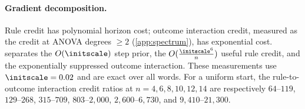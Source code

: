 \begin{table}[H]
\centering\small
{}
\caption{\textbf{Outcome escape grows exponentially while step escape stays nearly constant.} $\initscale=0.002$, zero readout;
ranges are over three draws.}
\label{tab:exit-times}
\end{table}
\paragraph{Gradient decomposition.} Rule credit has polynomial horizon cost; outcome interaction credit, measured as the credit at ANOVA degrees $\ge2$ (\cref{app:spectrum}), has exponential cost.
 separates the $O(\initscale)$ step prior, the $O(\frac{\initscale^6}{n})$ useful rule credit, and the exponentially
suppressed outcome interaction. These measurements use $\initscale=0.02$ and are exact over all words.
For a uniform start, the rule-to-outcome interaction credit ratios at $n=4,6,8,10,12,14$ are respectively
$64$--$119$, $129$--$268$, $315$--$709$, $803$--$2{,}000$, $2{,}600$--$6{,}730$, and $9{,}410$--$21{,}300$.

